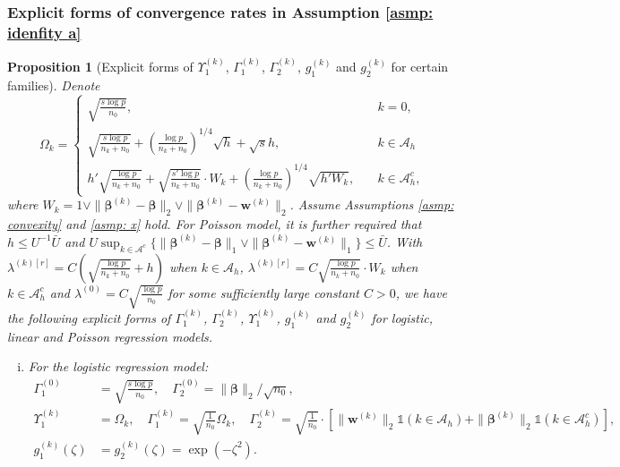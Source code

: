\documentclass[12pt]{article}
\newcommand{\lambdak}[1]{\lambda^{(#1)}}
\newcommand{\twonorm}[1]{\|#1\|_{2}}
\newcommand{\onenorm}[1]{\|#1\|_{1}}
\newcommand{\bbeta}{\bm{\beta}}
\newcommand{\bbetak}[1]{\bm{\beta}^{(#1)}}
\newcommand{\bwk}[1]{\bm{w}^{(#1)}}
\newcommand{\mah}{\mathcal{A}_h}
\newcommand{\mach}{\mathcal{A}^c_h}
\newcommand{\mac}{\mathcal{A}^c}
\newcommand{\<}{\langle}
\renewcommand{\>}{\rangle}
\newtheorem{proposition}{Proposition}
\begin{document}
\subsubsection{Explicit forms of convergence rates in Assumption \ref{asmp: idenfity a}}\label{subsubsec: explicit forms}
\begin{proposition}[Explicit forms of $\Upsilon^{(k)}_1$, $\Gamma_1^{(k)}$, $\Gamma_2^{(k)}$, $g_1^{(k)}$ and $g_2^{(k)}$ for certain families]\label{prop: gamma_1 gamma_2} 
Denote
\begin{equation}
	\Omega_k = \begin{cases}
		\sqrt{\frac{s \log p}{n_0}}, &\quad k = 0,\\
		\sqrt{\frac{s\log p}{n_k + n_0}}  + \left(\frac{\log p}{ n_k+n_0}\right)^{1/4}\sqrt{h} + \sqrt{s}h,& \quad k \in \mah \\
		h'\sqrt{\frac{\log p}{n_k + n_0}} + \sqrt{\frac{s'\log p}{n_k + n_0}}\cdot W_k  + \left(\frac{\log p}{n_k+n_0}\right)^{1/4}\sqrt{h'W_k}, & \quad k \in \mach,
	\end{cases}
\end{equation}
where $W_k = 1 \vee \twonorm{\bbetak{k}-\bbeta} \vee \twonorm{\bbetak{k}-\bwk{k}}$.  Assume Assumptions \ref{asmp: convexity} and \ref{asmp: x} hold. For Poisson model, it is further required that $h \leq U^{-1}\bar{U}$ and $U\sup_{k \in \mac}\{\onenorm{\bbetak{k}-\bbeta}\vee \onenorm{\bbetak{k}-\bwk{k}}\} \leq \bar{U}$. With $\lambda^{(k)[r]} = C\left(\sqrt{\frac{\log p}{n_k+n_0}} + h\right)$ when $k \in \mah$, $\lambda^{(k)[r]} = C\sqrt{\frac{\log p}{n_k+n_0}}\cdot W_k$ when $k \in \mach$ and $\lambdak{0} = C\sqrt{\frac{\log p}{n_0}}$ for some sufficiently large constant $C > 0$, we have the following explicit forms of $\Gamma_1^{(k)}$, $\Gamma_2^{(k)}$, $\Upsilon_1^{(k)}$, $g_1^{(k)}$ and $g_2^{(k)}$ for logistic, linear and Poisson regression models.
	\begin{enumerate}[(i)]
		\item For the logistic regression model:
			\begin{align}
				\Gamma_1^{(0)} &= \sqrt{\frac{s\log p}{n_0}}, \quad \Gamma_2^{(0)} =\twonorm{\bbeta}/\sqrt{n_0},\\
				\Upsilon_1^{(k)} &= \Omega_k, \quad \Gamma_1^{(k)} = \sqrt{\frac{1}{n_0}}\Omega_k, \quad
				\Gamma_2^{(k)} = \sqrt{\frac{1}{n_0}} \cdot\left[\twonorm{\bwk{k}}\mathds{1}(k \in \mah) + \twonorm{\bbetak{k}}\mathds{1}(k \in \mach)\right], \\
				g_1^{(k)}(\zeta)  &= g_2^{(k)}(\zeta) = \exp(-\zeta^2).
			\end{align}

\end{enumerate}
\end{proposition}
\end{document}
